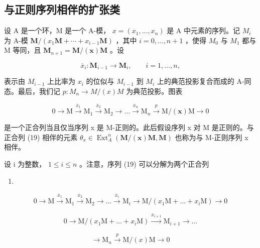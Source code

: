 \subsection{与正则序列相伴的扩张类}

设 A 是一个环，M 是一个 A-模， \(x = (x_{1}, \ldots, x_{n})\) 是 A 中元素的序列。记 \(M_{i}\) 为 A-模 \(\mathbf{M}/(x_{1}\mathbf{M} + \cdots + x_{i-1}\mathbf{M})\) ，其中 \(i = 0, \ldots, n + 1\) ，使得 \(M_{0}\) 与 \(M_{1}\) 都与 M 等同，且 \(\mathbf{M}_{n+1} = \mathbf{M}/(\mathbf{x})\mathbf{M}\) 。设

\[
\overline {{x}} _ {i}: \mathbf {M} _ {i - 1} \to \mathbf {M} _ {i}, \qquad i = 1, \dots , n,
\]

表示由 \(M_{i-1}\) 上比率为 \(x_{i}\) 的位似与 \(M_{i-1}\) 到 \(M_{i}\) 上的典范投影复合而成的 A-同态。最后，我们记 \(p: M_{n} \to M/(x)M\) 为典范投影。图表

\[
0 \longrightarrow \mathrm{M} \xrightarrow {\overline {{{x}}} _ {1}} \mathrm{M} _ {1} \xrightarrow {\overline {{{x}}} _ {2}} \mathrm{M} _ {2} \longrightarrow \dots \xrightarrow {\overline {{{x}}} _ {n}} \mathrm{M} _ {n} \xrightarrow {p} \mathrm{M} / (\boldsymbol {x}) \mathrm{M} \longrightarrow 0\tag{19}
\]

是一个正合列当且仅当序列 x 是 M-正则的。此后假设序列 x 对 M 是正则的。与正合列 (19) 相伴的元素 \(\theta_{x} \in \operatorname{Ext}_{A}^{n}(\mathbf{M}/(\mathbf{x})\mathbf{M}, \mathbf{M})\) 也称为与 M-正则序列 x 相伴。

设 i 为整数， \(1 \leqslant i \leqslant n\) 。注意，序列 (19) 可以分解为两个正合列

\begin{enumerate}
\def\labelenumi{(\arabic{enumi})}
\setcounter{enumi}{19}
\tightlist
\item
\end{enumerate}

\[
0 \longrightarrow \mathrm{M} \xrightarrow {\overline {{x}} _ {1}} \mathrm{M} _ {1} \xrightarrow {\overline {{x}} _ {2}} \mathrm{M} _ {2} \longrightarrow \dots \xrightarrow {\overline {{x}} _ {i}} \mathrm{M} _ {i} \longrightarrow \mathrm{M} / (x _ {1} \mathrm{M} + \dots + x _ {i} \mathrm{M}) \longrightarrow 0\tag{21}
\]

\[
0 \longrightarrow \mathrm{M} / (x _ {1} \mathrm{M} + \dots + x _ {i} \mathrm{M}) \xrightarrow {\overline {{x}} _ {i + 1}} \mathrm{M} _ {i + 1} \longrightarrow \dots
\]

\[
\longrightarrow \mathrm{M} _ {n} \stackrel {p} {\longrightarrow} \mathrm{M} / (x) \mathrm{M} \longrightarrow 0
\]

